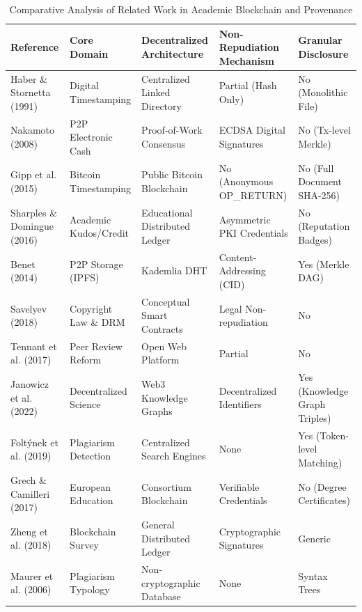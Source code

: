 \documentclass[conference]{IEEEtran}
\begin{document}
\begin{table}[t]
\centering
\caption{Comparative Analysis of Related Work in Academic Blockchain and Provenance}
\label{tab:comparative}
\begin{tabular}{@{}lllll@{}}
\toprule
\textbf{Reference} & \textbf{Core Domain} & \textbf{Decentralized Architecture} & \textbf{Non-Repudiation Mechanism} & \textbf{Granular Disclosure} \\ \midrule
Haber \& Stornetta \cite{haber1991timestamp} (1991) & Digital Timestamping & Centralized Linked Directory & Partial (Hash Only) & No (Monolithic File) \\
Nakamoto \cite{nakamoto2008bitcoin} (2008) & P2P Electronic Cash & Proof-of-Work Consensus & ECDSA Digital Signatures & No (Tx-level Merkle) \\
Gipp et al. \cite{gipp2015decentralized} (2015) & Bitcoin Timestamping & Public Bitcoin Blockchain & No (Anonymous OP\_RETURN) & No (Full Document SHA-256) \\
Sharples \& Domingue \cite{sharples2016blockchain} (2016) & Academic Kudos/Credit & Educational Distributed Ledger & Asymmetric PKI Credentials & No (Reputation Badges) \\
Benet \cite{benet2014ipfs} (2014) & P2P Storage (IPFS) & Kademlia DHT & Content-Addressing (CID) & Yes (Merkle DAG) \\
Savelyev \cite{savelyev2018copyright} (2018) & Copyright Law \& DRM & Conceptual Smart Contracts & Legal Non-repudiation & No \\
Tennant et al. \cite{tennant2017innovations} (2017) & Peer Review Reform & Open Web Platform & Partial & No \\
Janowicz et al. \cite{janowicz2022desci} (2022) & Decentralized Science & Web3 Knowledge Graphs & Decentralized Identifiers & Yes (Knowledge Graph Triples) \\
Folt\'{y}nek et al. \cite{foltynek2019plagiarism} (2019) & Plagiarism Detection & Centralized Search Engines & None & Yes (Token-level Matching) \\
Grech \& Camilleri \cite{grech2017education} (2017) & European Education & Consortium Blockchain & Verifiable Credentials & No (Degree Certificates) \\
Zheng et al. \cite{zheng2018survey} (2018) & Blockchain Survey & General Distributed Ledger & Cryptographic Signatures & Generic \\
Maurer et al. \cite{maurer2006plagiarism} (2006) & Plagiarism Typology & Non-cryptographic Database & None & Syntax Trees \\

\end{tabular}
\end{table}
\end{document}
